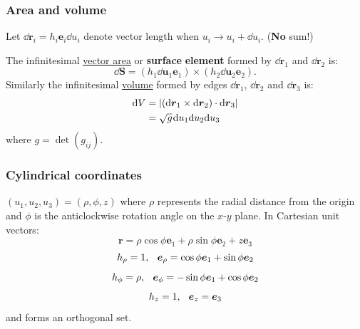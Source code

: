 \documentclass{article}
\newcommand{\vc}[1]{\boldsymbol{#1}}
\begin{document}
\begin{multicols*}{3}
\subsubsection*{Area and volume}
Let $\dd\vc{r}_i=h_i\vc{e}_i\dd u_i$ denote
vector length when
$u_i\rightarrow u_i+\dd u_i$.
(\textbf{No} sum!)

The infinitesimal \underline{vector area}
or \textbf{surface} \textbf{element}
formed by $\dd\vc{r}_1$
and $\dd\vc{r}_2$ is:
$$\dd\vc{S}=(h_1\dd\vc{u}_1\vc{e}_1)
\times(h_2\dd\vc{u}_2\vc{e}_2).$$
Similarly the infinitesimal \underline{volume} 
formed by edges $\dd\vc{r}_1$, $\dd\vc{r}_2$
and $\dd\vc{r}_3$ is:
\begin{align*}
    \dd V&=|(\dd\vc{r}_1\times\dd\vc{r}_2)
    \cdot\dd\vc{r}_3| \\
    &=\sqrt{g}\hspace{0.01in}\dd u_1\dd u_2\dd u_3
\end{align*}
where $g=\det(g_{ij})$.

\subsubsection*{Cylindrical coordinates}
$(u_1,u_2,u_3)=(\rho,\phi,z)$ where $\rho$
represents the radial distance from the origin
and $\phi$ is the anticlockwise rotation angle
on the $x$-$y$ plane. In Cartesian unit vectors:
$$\vc{r}=\rho\cos\phi\vc{e}_1
+\rho\sin\phi\vc{e}_2+z\vc{e}_3$$
$$h_{\rho}=1,
\hspace{0.1in}
\vc{e}_{\rho}=\cos\phi\vc{e}_1+\sin\phi\vc{e}_2$$
$$h_{\phi}=\rho,
\hspace{0.1in}
\vc{e}_{\phi}=-\sin\phi\vc{e}_1+\cos\phi\vc{e}_2$$
$$h_z=1,
\hspace{0.1in}
\vc{e}_{z}=\vc{e}_3$$
and forms an orthogonal set.


\end{multicols*}
\end{document}
